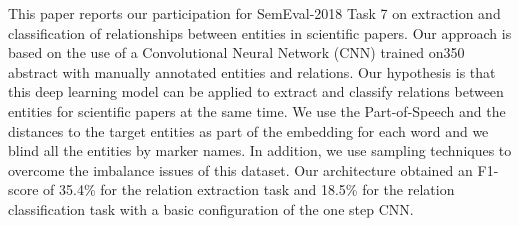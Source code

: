 This paper reports our participation for SemEval-2018 Task 7 on extraction and classification of relationships between entities in scientific papers. Our approach is based on the use of a Convolutional Neural Network (CNN) trained on350 abstract with manually annotated entities and relations. Our hypothesis is that this deep learning model can be applied to extract and classify relations between entities for scientific papers at the same time. We use the Part-of-Speech and the distances to the target entities as part of the embedding for each word and we blind all the entities by marker names. In addition, we use sampling techniques to overcome the imbalance issues of this dataset. Our architecture obtained an F1-score of 35.4\% for the relation extraction task and 18.5\% for the relation classification task with a basic configuration of the one step CNN.
